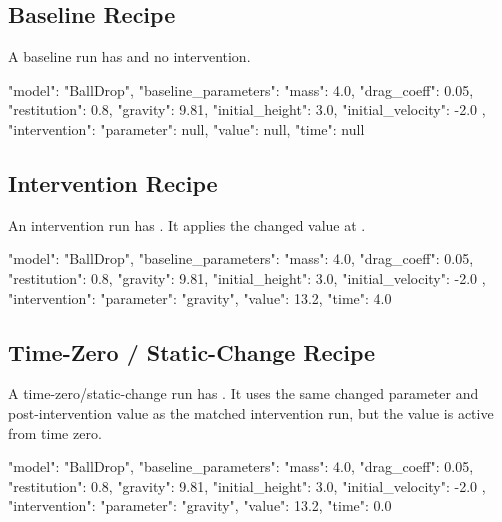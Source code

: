 \documentclass[11pt]{article}
\begin{document}
\subsection*{Baseline Recipe}\label{sec:candidate-generation-baseline-recipe}

A baseline run has  and no intervention.

\begin{DocCode}
{
  "model": "BallDrop",
  "baseline_parameters": {
    "mass": 4.0,
    "drag_coeff": 0.05,
    "restitution": 0.8,
    "gravity": 9.81,
    "initial_height": 3.0,
    "initial_velocity": -2.0
  },
  "intervention": {
    "parameter": null,
    "value": null,
    "time": null
  }
}
\end{DocCode}

\subsection*{Intervention Recipe}

An intervention run has .
It applies the changed value at .

\begin{DocCode}
{
  "model": "BallDrop",
  "baseline_parameters": {
    "mass": 4.0,
    "drag_coeff": 0.05,
    "restitution": 0.8,
    "gravity": 9.81,
    "initial_height": 3.0,
    "initial_velocity": -2.0
  },
  "intervention": {
    "parameter": "gravity",
    "value": 13.2,
    "time": 4.0
  }
}
\end{DocCode}

\subsection*{Time-Zero / Static-Change Recipe}\label{sec:candidate-generation-time0-baseline-recipe}

A time-zero/static-change run has .
It uses the same changed parameter and post-intervention value as the matched intervention run, but the value is active from time zero.

\begin{DocCode}
{
  "model": "BallDrop",
  "baseline_parameters": {
    "mass": 4.0,
    "drag_coeff": 0.05,
    "restitution": 0.8,
    "gravity": 9.81,
    "initial_height": 3.0,
    "initial_velocity": -2.0
  },
  "intervention": {
    "parameter": "gravity",
    "value": 13.2,
    "time": 0.0
  }
}
\end{DocCode}
\end{document}
